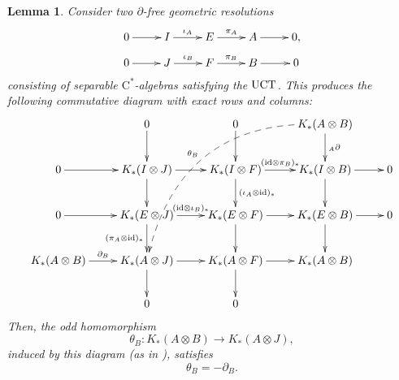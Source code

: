 \documentclass[a4paper,10pt]{amsart}
\newcommand{\T}[1]{\textup{#1}}
\newcommand{\cstar}{\ensuremath{\mathrm C^\ast}}
\newcounter{theorem}
\newtheorem{lemma}[theorem]{Lemma}
\numberwithin{equation}{section}
\numberwithin{theorem}{section}
\newcommand{\id}{\mathrm{id}}
\begin{document}
\begin{lemma}
	\label{lem:alg}
	Consider two $\partial$-free geometric resolutions 
	\begin{align*}
		\xymatrix@R-1.5em{
			0 \ar[r] & I \ar[r]^-{\iota_A} & E \ar[r]^-{\pi_A} & A \ar[r] & 0 , \\ 
			0 \ar[r] & J \ar[r]^-{\iota_B} & F \ar[r]^-{\pi_B} & B \ar[r] & 0 
		} 
	\end{align*}
	consisting of separable $\cstar$-algebras satisfying the $\T{UCT}$.  This produces the following commutative diagram with exact rows and columns:
	\[
		\xymatrix{
			& 0 \ar[d] & 0 \ar[d] & K_*(A \otimes B) \ar[d]^-{{}_A \partial} \ar@/_4.2em/@{-->}[dddll]_-{\theta_B} & \\
			0 \ar[r] & K_*(I \otimes J) \ar[r] \ar[d] & K_*(I \otimes F) \ar[r]^-{(\id \otimes \pi_B)_*} \ar[d]^-{(\iota_A \otimes \id)_*} & K_*(I \otimes B) \ar[r] \ar[d] & 0 \\
			0 \ar[r] & K_*(E \otimes J) \ar[r]^-{(\id \otimes \iota_B)_*} \ar[d]_-{(\pi_A \otimes \id)_*} & K_*(E \otimes F) \ar[r] \ar[d] & K_*(E \otimes B) \ar[r] \ar[d] & 0 \\
		K_*(A \otimes B) \ar[r]^-{\partial_B} &	K_*(A \otimes J) \ar[r] \ar[d] & K_*(A \otimes F) \ar[r] \ar[d] & K_*(A \otimes B) \\
		& 	0 & 0 
		}
	\]
	Then, the odd homomorphism
	$$
		\theta_B \colon K_*(A \otimes B) \to K_*(A \otimes J),
	$$ 
	induced by this diagram (as in \cite[Section 3]{aifK}), satisfies
	$$
		\theta_B = - \partial_B.
	$$
\end{lemma}
\end{document}
